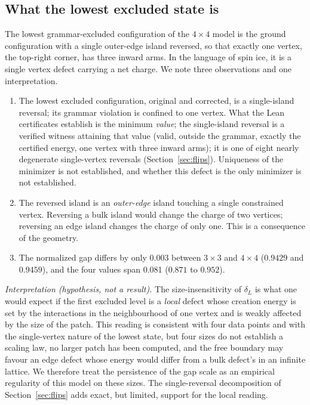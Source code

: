 \documentclass[11pt,a4paper]{article}
\theoremstyle{plain}
\theoremstyle{definition}
\theoremstyle{remark}
\begin{document}
\subsection{What the lowest excluded state is}
The lowest grammar-excluded configuration of the $4\times4$ model is the ground configuration with a single outer-edge island reversed, so that exactly one vertex, the top-right corner, has three inward arms. In the language of spin ice, it is a single vertex defect carrying a net charge. We note three observations and one interpretation.
\begin{enumerate}[leftmargin=1.6em]
\item The lowest excluded configuration, original and corrected, is a single-island reversal; its grammar violation is confined to one vertex. What the Lean certificates establish is the minimum \emph{value}; the single-island reversal is a verified witness attaining that value (valid, outside the grammar, exactly the certified energy, one vertex with three inward arms); it is one of eight nearly degenerate single-vertex reversals (Section~\ref{sec:flips}). Uniqueness of the minimizer is not established, and whether this defect is the only minimizer is not established.
\item The reversed island is an \emph{outer-edge} island touching a single constrained vertex. Reversing a bulk island would change the charge of two vertices; reversing an edge island changes the charge of only one. This is a consequence of the geometry.
\item The normalized gap differs by only 0.003 between $3\times3$ and $4\times4$ ($0.9429$ and $0.9459$), and the four values span 0.081 ($0.871$ to $0.952$).
\end{enumerate}
\emph{Interpretation (hypothesis, not a result).} The size-insensitivity of $\delta_L$ is what one would expect if the first excluded level is a \emph{local} defect whose creation energy is set by the interactions in the neighbourhood of one vertex and is weakly affected by the size of the patch. This reading is consistent with four data points and with the single-vertex nature of the lowest state, but four sizes do not establish a scaling law, no larger patch has been computed, and the free boundary may favour an edge defect whose energy would differ from a bulk defect's in an infinite lattice. We therefore treat the persistence of the gap scale as an empirical regularity of this model on these sizes. The single-reversal decomposition of Section~\ref{sec:flips} adds exact, but limited, support for the local reading.
\end{document}

